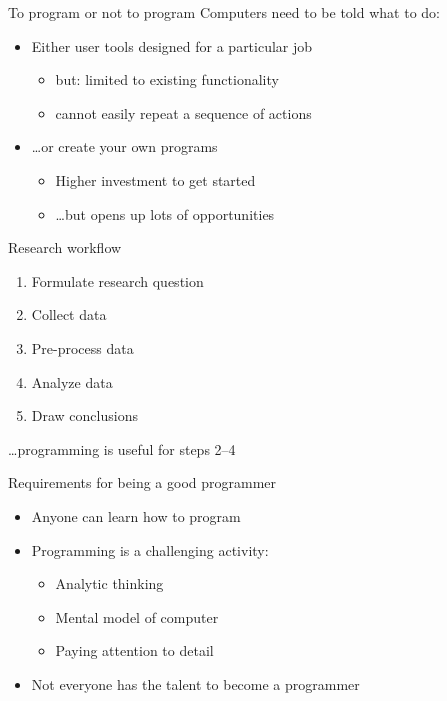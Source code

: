 \documentclass[aspectratio=169,usenames,dvipsnames]{beamer}
\begin{document}
\begin{frame}{To program or not to program}
    Computers need to be told what to do:

    \begin{itemize}
        \item Either user tools designed for a particular job
            \begin{itemize}
                \item but: limited to existing functionality
                \item cannot easily repeat a sequence of actions
            \end{itemize}

        \item \dots or create your own programs
            \begin{itemize}
                \item Higher investment to get started
                \item \dots but opens up lots of opportunities
            \end{itemize}
    \end{itemize}
\end{frame}

\begin{frame}{Research workflow}
    \begin{enumerate}
        \item Formulate research question
        \item Collect data
        \item Pre-process data
        \item Analyze data
        \item Draw conclusions
    \end{enumerate}

    \pause
    \dots programming is useful for steps 2--4
\end{frame}

\begin{frame}{Requirements for being a good programmer}
    \begin{itemize}
        \item Anyone can learn how to program
        \item Programming is a challenging activity:
            \begin{itemize}
                \item Analytic thinking
                \item Mental model of computer
                \item Paying attention to detail
            \end{itemize}
        \item Not everyone has the talent to become
            a  programmer
    \end{itemize}
\end{frame}
\end{document}
